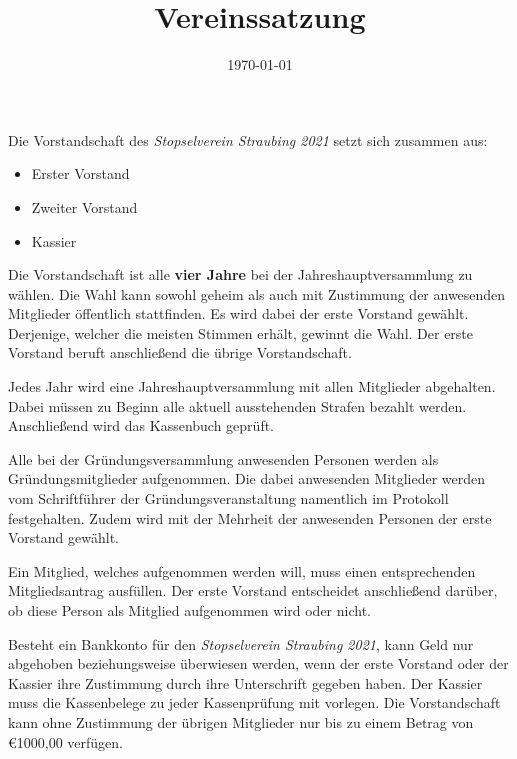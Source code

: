 \documentclass[a4paper,12pt]{scrartcl}
\title{Vereinssatzung}
\author{\vereinsName}
\date{\today}
\newcommand{\vereinsName}{Stopselverein Straubing 2021}
\begin{document}
    \maketitle

    Die Vorstandschaft des \emph{\vereinsName} setzt sich zusammen aus:
    \begin{itemize}
        \item Erster Vorstand
        \item Zweiter Vorstand
        \item Kassier
    \end{itemize}

    Die Vorstandschaft ist alle \textbf{vier Jahre}
    bei der Jahreshauptversammlung zu wählen.
    Die Wahl kann sowohl geheim als auch mit Zustimmung der anwesenden Mitglieder
    öffentlich stattfinden.
    Es wird dabei der erste Vorstand gewählt.
    Derjenige, welcher die meisten Stimmen erhält, gewinnt die Wahl.
    Der erste Vorstand beruft anschließend die übrige Vorstandschaft.

    Jedes Jahr wird eine Jahreshauptversammlung mit allen Mitglieder abgehalten.
    Dabei müssen zu Beginn alle aktuell ausstehenden Strafen bezahlt werden.
    Anschließend wird das Kassenbuch geprüft.

    Alle bei der Gründungsversammlung anwesenden Personen werden als Gründungsmitglieder aufgenommen.
    Die dabei anwesenden Mitglieder werden vom Schriftführer der Gründungsveranstaltung namentlich im Protokoll festgehalten.
    Zudem wird mit der Mehrheit der anwesenden Personen der erste Vorstand gewählt.

    Ein Mitglied, welches aufgenommen werden will, muss einen entsprechenden Mitgliedsantrag ausfüllen.
    Der erste Vorstand entscheidet anschließend darüber,
    ob diese Person als Mitglied aufgenommen wird oder nicht.

    Besteht ein Bankkonto für den \emph{\vereinsName}, kann Geld nur abgehoben beziehungsweise überwiesen werden,
    wenn der erste Vorstand oder der Kassier ihre Zustimmung durch ihre Unterschrift gegeben haben.
    Der Kassier muss die Kassenbelege zu jeder Kassenprüfung mit vorlegen.
    Die Vorstandschaft kann ohne Zustimmung der übrigen Mitglieder nur bis zu einem Betrag von \euro{1000,00} verfügen.
\end{document}
